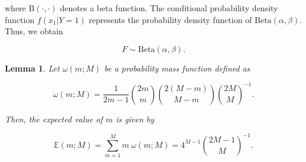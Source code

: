 \documentclass[11pt, class=article, crop=false]{standalone}
\newtheorem{lemma}{Lemma}
\begin{document}
where $\mbox{B}(\cdot, \cdot)$ denotes a beta function.
The conditional probability density function $f(x_1 | Y = 1)$ represents the probability density function of $\mbox{Beta}(\alpha, \beta)$.
Thus, we obtain

\begin{equation}
    F \sim \mbox{Beta}(\alpha, \beta).
\end{equation}

\begin{lemma}
Let $\omega(m; M)$ be a probability mass function defined as

\begin{equation}
    \omega(m; M) = \frac{1}{2m - 1} \binom{2m}{m} \binom{2(M - m)}{M - m} \binom{2M}{M}^{-1}.
\end{equation}

Then, the expected value of $m$ is given by

\begin{equation}
    \mathbb{E}(m; M) = \sum_{m = 1}^M m~\omega(m; M) = 4^{M-1} \binom{2M-1}{M}^{-1}.
\end{equation}
\end{lemma}
\end{document}
